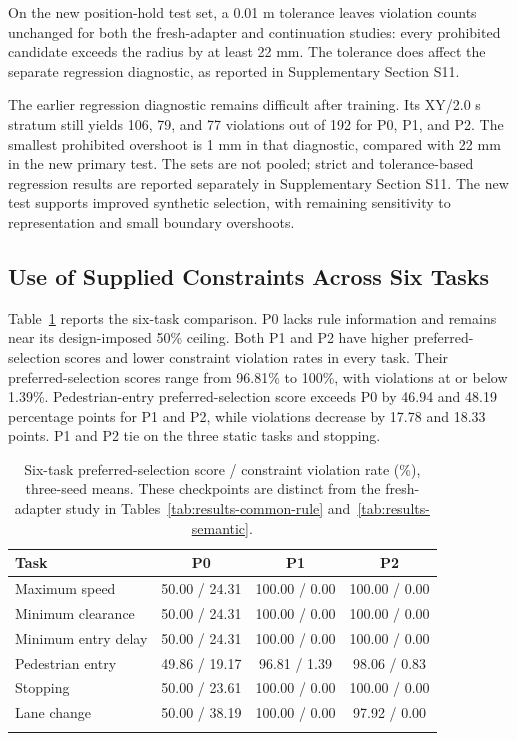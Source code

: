 On the new position-hold test set, a 0.01 m tolerance leaves violation counts
unchanged for both the fresh-adapter and continuation studies: every prohibited
candidate exceeds the radius by at least 22 mm. The tolerance does affect the
separate regression diagnostic, as reported in Supplementary Section S11.

The earlier regression diagnostic remains difficult after training. Its
XY/2.0 s stratum still yields 106, 79, and 77 violations out of
192 for P0, P1, and P2. The smallest prohibited overshoot is 1 mm in that
diagnostic, compared with 22 mm in the new primary test. The sets are not
pooled; strict and tolerance-based regression results are reported separately
in Supplementary Section S11. The new test supports improved synthetic
selection, with remaining sensitivity to representation and small boundary
overshoots.

\subsection{Use of Supplied Constraints Across Six Tasks}\label{sec:results-six-tasks}

Table~\ref{tab:results-six-tasks} reports the six-task comparison. P0 lacks rule
information and remains near its design-imposed 50\% ceiling. Both P1 and P2
have higher preferred-selection scores and lower constraint violation rates in every task. Their preferred-selection scores
range from 96.81\% to 100\%, with violations at or below 1.39\%.
Pedestrian-entry preferred-selection score exceeds P0 by 46.94 and 48.19 percentage points for
P1 and P2, while violations decrease by 17.78 and 18.33 points. P1 and P2 tie
on the three static tasks and stopping.

\begin{table}[tbp]
\caption{Six-task preferred-selection score / constraint violation rate (\%), three-seed means. These
checkpoints are distinct from the fresh-adapter study in
Tables~\ref{tab:results-common-rule} and~\ref{tab:results-semantic}.}
\label{tab:results-six-tasks}
\centering\footnotesize
\begin{tabular*}{\textwidth}{@{\extracolsep\fill}lccc@{}}
\toprule
Task & P0 & P1 & P2\\
\midrule
Maximum speed & 50.00 / 24.31 & 100.00 / 0.00 & 100.00 / 0.00\\
Minimum clearance & 50.00 / 24.31 & 100.00 / 0.00 & 100.00 / 0.00\\
Minimum entry delay & 50.00 / 24.31 & 100.00 / 0.00 & 100.00 / 0.00\\
Pedestrian entry & 49.86 / 19.17 & 96.81 / 1.39 & 98.06 / 0.83\\
Stopping & 50.00 / 23.61 & 100.00 / 0.00 & 100.00 / 0.00\\
Lane change & 50.00 / 38.19 & 100.00 / 0.00 & 97.92 / 0.00\\
\botrule
\end{tabular*}
\end{table}

